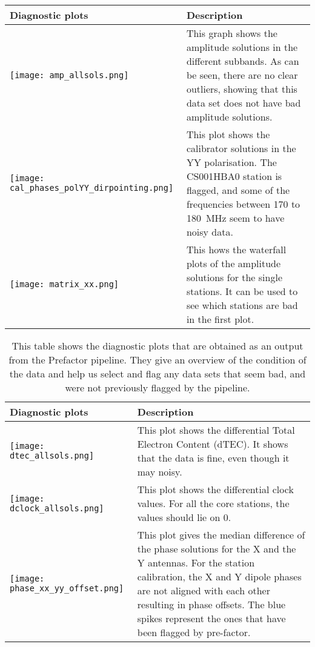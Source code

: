 \documentclass[../main/thesis_msc.tex]{subfiles}
\begin{document}
\begin{table}[ht] 
\centering 
\begin{tabular}{m{8.5cm}|m{4.5cm} }      %
\hline\hline                                      %
Diagnostic plots  & Description \\ [0.5ex] %
\midrule\addlinespace[1.5ex]
         \texttt{[image: amp\_allsols.png]}
         & This graph shows the amplitude solutions in the different subbands. As can be seen, there are no clear outliers, showing that this data set does not have bad amplitude solutions. \\ [1ex]
\midrule\addlinespace[1.5ex] 
		 \texttt{[image: cal\_phases\_polYY\_dirpointing.png]}
		 &  This plot shows the calibrator solutions in the YY polarisation. The CS001HBA0 station is flagged, and some of the frequencies between 170 to 180~MHz seem to have noisy data. \\
\midrule\addlinespace[1.5ex]
         \texttt{[image: matrix\_xx.png]}
         & This hows the waterfall plots of the amplitude solutions for the single stations. It can be used to see which stations are bad in the first plot.\\
\end{tabular}
\end{table}    
\newpage
\begin{table}[ht] 
\centering        
\begin{tabular}{m{8.5cm}|m{4.5cm} }      %
\hline\hline                                      %
Diagnostic plots  & Description \\ [0.5ex] %
\midrule\addlinespace[1.5ex]
         \texttt{[image: dtec\_allsols.png]}
         & This plot shows the differential Total Electron Content (dTEC). It shows that the data is fine, even though it may noisy.\\
\midrule\addlinespace[1.5ex]
         \texttt{[image: dclock\_allsols.png]}
         & This plot shows the differential clock values. For all the core stations, the values should lie on 0.\\
\midrule\addlinespace[1.5ex]
		 \texttt{[image: phase\_xx\_yy\_offset.png]}
		 & This plot gives the median difference of the phase solutions for the X and the Y antennas. For the station calibration, the X and Y dipole phases are not aligned with each other resulting in phase offsets. The blue spikes represent the ones that have been flagged by pre-factor.\\
\end{tabular}
\caption{This table shows the diagnostic plots that are obtained as an output from the Prefactor pipeline. They give an overview of the condition of the data and help us select and flag any data sets that seem bad, and were not previously flagged by the pipeline.}
\label{diagnostic}    
\end{table}
\end{document}
